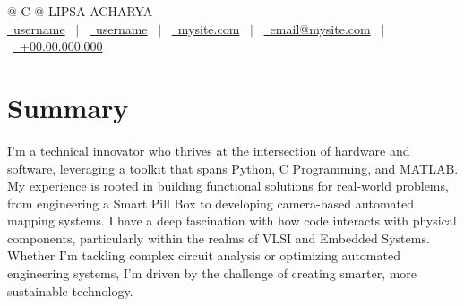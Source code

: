 \documentclass[a4paper,12pt]{article}
\begin{document}
\pagestyle{empty} 



\begin{tabularx}{\linewidth}{@{} C @{}}
\Huge{LIPSA ACHARYA} \\[7.5pt]
\href{https://github.com/username}{\raisebox{-0.05\height}\faGithub\ username} \ $|$ \ 
\href{https://linkedin.com/in/username}{\raisebox{-0.05\height}\faLinkedin\ username} \ $|$ \ 
\href{https://mysite.com}{\raisebox{-0.05\height}\faGlobe \ mysite.com} \ $|$ \ 
\href{mailto:email@mysite.com}{\raisebox{-0.05\height}\faEnvelope \ email@mysite.com} \ $|$ \ 
\href{tel:+91 6363739773}{\raisebox{-0.05\height}\faMobile \ +00.00.000.000} \\
\end{tabularx}


\section{Summary}
I’m a technical innovator who thrives at the intersection of hardware and software, leveraging a toolkit that spans Python, C Programming, and MATLAB. My experience is rooted in building functional solutions for real-world problems, from engineering a Smart Pill Box to developing camera-based automated mapping systems. I have a deep fascination with how code interacts with physical components, particularly within the realms of VLSI and Embedded Systems. Whether I’m tackling complex circuit analysis or optimizing automated engineering systems, I’m driven by the challenge of creating smarter, more sustainable technology.
\end{document}
